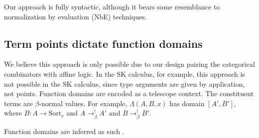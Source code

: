 \documentclass{article}
\newcommand{\sk}{\(\text{SK}\)}
\newcommand{\arr}{\rightarrow}
\newcommand{\sort}[1]{\text{Sort}_{#1}}
\newcommand{\barr}{\arr_{\beta}}
\begin{document}
Our approach is fully syntactic, although it bears some resemblance to normalization by evaluation (NbE) techniques.

\subsection{Term points dictate function domains}\label{etadom}

We believe this approach is only possible due to our design pairing the categorical combinators with affine logic. In the \sk{} calculus, for example, this approach is not possible in the \sk{} calculus, since type arguments are given by application, not points. Function domains are encoded as a telescope context. The constituent terms are \(\beta\)-normal values. For example, \(\Lambda(A, B, x)\) has domain \([A', B']\), where \(B : A \arr \sort{v}\) and \(A \barr^{!} A'\) and \(B \barr^{!} B'\).

Function domains are inferred as such \label{domunary} \label{dombinary}.
\end{document}
